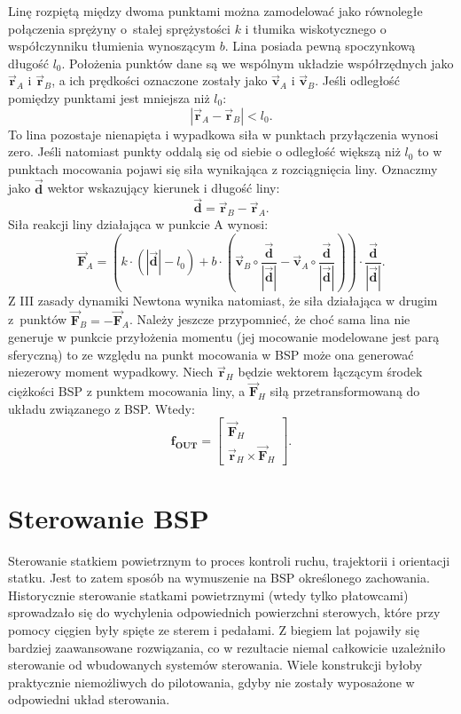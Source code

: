 Linę rozpiętą między dwoma punktami można zamodelować jako równoległe połączenia sprężyny o~stałej sprężystości $k$ i tłumika wiskotycznego o współczynniku tłumienia wynoszącym $b$. Lina posiada pewną spoczynkową długość $l_0$. Położenia punktów dane są we wspólnym układzie współrzędnych jako $\vec{\bm{r}}_{A}$ i $\vec{\bm{r}}_{B}$, a ich prędkości oznaczone zostały jako $\vec{\bm{v}}_{A}$ i $\vec{\bm{v}}_{B}$. Jeśli odległość pomiędzy punktami jest mniejsza niż $l_0$:
\[
	| \vec{\bm{r}}_{A} - \vec{\bm{r}}_{B} | < l_0.
\]
To lina pozostaje nienapięta i wypadkowa siła w punktach przyłączenia wynosi zero. Jeśli natomiast punkty oddalą się od siebie o odległość większą niż $l_0$ to w punktach mocowania pojawi się siła wynikająca z rozciągnięcia liny. Oznaczmy jako $\vec{\bm{d}}$ wektor wskazujący kierunek i długość liny:
\[
	\vec{\bm{d}} =  \vec{\bm{r}}_{B} - \vec{\bm{r}}_{A}.
\]
Siła reakcji liny działająca w punkcie A wynosi:
\[
	\vec{\bm{F}}_{A} =\left(  k \cdot \left( |\vec{\bm{d}}| - l_0 \right) + b \cdot \left( \vec{\bm{v}}_{B}  \circ \frac{\vec{\bm{d}}}{|\vec{\bm{d}}|} - \vec{\bm{v}}_{A} \circ \frac{\vec{\bm{d}}}{|\vec{\bm{d}}|} \right) \right)  \cdot \frac{\vec{\bm{d}}}{|\vec{\bm{d}}|}.
\]
Z III zasady dynamiki Newtona wynika natomiast, że siła działająca w drugim z~punktów $\vec{\bm{F}}_{B} = - \vec{\bm{F}}_{A}$. Należy jeszcze przypomnieć, że choć sama lina nie generuje w punkcie przyłożenia momentu (jej mocowanie modelowane jest parą sferyczną) to ze względu na punkt mocowania w BSP może ona generować niezerowy moment wypadkowy. Niech $\vec{\bm{r}}_{H}$ będzie wektorem łączącym środek ciężkości BSP z punktem mocowania liny, a $\vec{\bm{F}}_{H}$ siłą przetransformowaną do układu związanego z BSP. Wtedy:
\[
	\bm{f_{OUT}} = \begin{bmatrix} \vec{\bm{F}}_{H} \\ \vec{\bm{r}}_{H} \times \vec{\bm{F}}_{H} \end{bmatrix}.
\]


\section{Sterowanie BSP}

Sterowanie statkiem powietrznym to proces kontroli ruchu, trajektorii i orientacji statku. Jest to zatem sposób na wymuszenie na BSP określonego zachowania. Historycznie sterowanie statkami powietrznymi (wtedy tylko płatowcami) sprowadzało się do wychylenia odpowiednich powierzchni sterowych, które przy pomocy cięgien były spięte ze sterem i pedałami. Z biegiem lat pojawiły się bardziej zaawansowane rozwiązania, co w rezultacie niemal całkowicie uzależniło sterowanie od wbudowanych systemów sterowania. Wiele konstrukcji byłoby praktycznie niemożliwych do pilotowania, gdyby nie zostały wyposażone w odpowiedni układ sterowania.\\


